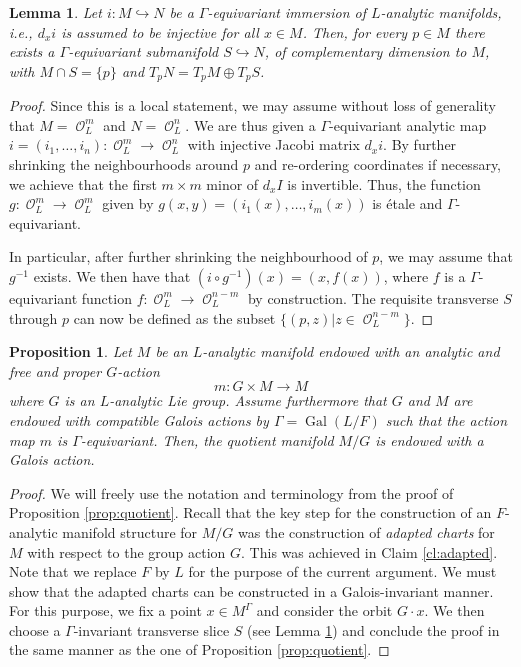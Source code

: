 \documentclass{article}
\DeclareMathOperator{\Oc}{\mathcal{O}}
\DeclareMathOperator{\Gal}{Gal}
\theoremstyle{definition}
\theoremstyle{plain}
\newtheorem{proposition}[definition]{Proposition}
\newtheorem{lemma}[definition]{Lemma}
\begin{document}
\begin{lemma}\label{lemma:Galois-slice}
Let $i\colon M \hookrightarrow N$ be a $\Gamma$-equivariant immersion of $L$-analytic manifolds, i.e., $d_xi$ is assumed to be injective for all $x \in M$. Then, for every $p \in M$ there exists a $\Gamma$-equivariant submanifold $S \hookrightarrow N$, of complementary dimension to $M$, with $M \cap S =\{p\}$ and $T_p N = T_p M \oplus T_p S$.
\end{lemma}
\begin{proof}
Since this is a local statement, we may assume without loss of generality that $M=\Oc_L^m$ and $N=\Oc_L^n$. We are thus given a $\Gamma$-equivariant analytic map $i=(i_1,\dots,i_n)\colon \Oc_L^m \to \Oc_L^n$ with injective Jacobi matrix $d_xi$.  By further shrinking the neighbourhoods around $p$ and re-ordering coordinates if necessary, we achieve that the first $m\times m$ minor of $d_xI$ is invertible. Thus, the function $g\colon \Oc_L^m \to \Oc_L^m$ given by
$g(x,y) = (i_1(x),\dots,i_m(x))$ is \'etale and $\Gamma$-equivariant.

In particular, after further shrinking the neighbourhood of $p$, we may assume that $g^{-1}$ exists. We then have that $(i \circ g^{-1})(x) = (x,f(x))$, where $f$ is a $\Gamma$-equivariant function $f\colon \Oc_{L}^m \to \Oc_L^{n-m}$ by construction. The requisite transverse $S$ through $p$ can now be defined as the subset
$\{(p,z)|z\in \Oc_L^{n-m}\}.$
\end{proof}


\begin{proposition}\label{prop:Galois-quotient}
Let $M$ be an $L$-analytic manifold endowed with an analytic and free and proper $G$-action
$$m\colon G \times M \to M$$ where $G$ is an $L$-analytic Lie group. Assume furthermore that $G$ and $M$ are endowed with compatible Galois actions by $\Gamma = \Gal(L/F)$ such that the action map $m$ is $\Gamma$-equivariant. Then, the quotient manifold $M/G$ is endowed with a Galois action.
\end{proposition}
\begin{proof} 

We will freely use the notation and terminology from the proof of Proposition \ref{prop:quotient}. Recall that the key step for the construction of an $F$-analytic manifold structure for $M/G$ was the construction of \emph{adapted charts} for $M$ with respect to the group action $G$. This was achieved in Claim \ref{cl:adapted}. Note that we replace $F$ by $L$ for the purpose of the current argument. We must show that the adapted charts can be constructed in a Galois-invariant manner. For this purpose, we fix a point $x \in M^{\Gamma}$ and consider the orbit $G\cdot{} x$. We then choose a $\Gamma$-invariant transverse slice $S$ (see Lemma \ref{lemma:Galois-slice}) and conclude the proof in the same manner as the one of Proposition \ref{prop:quotient}.
\end{proof}
\end{document}
